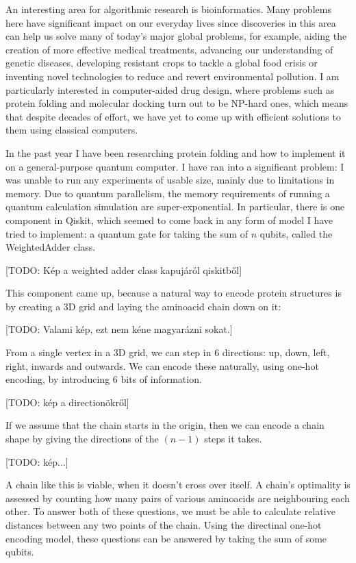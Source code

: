 An interesting area for algorithmic research is bioinformatics. Many problems here have significant impact on our everyday lives since discoveries in this area can help us solve many of today’s major global problems, for example, aiding the creation of more effective medical treatments, advancing our understanding of genetic diseases, developing resistant crops to tackle a global food crisis or inventing novel technologies to reduce and revert environmental pollution. I am particularly interested in computer-aided drug design, where problems such as protein folding and molecular docking turn out to be NP-hard ones, which means that despite decades of effort, we have yet to come up with efficient solutions to them using classical computers.

In the past year I have been researching protein folding and how to implement it on a general-purpose quantum computer. I have ran into a significant problem: I was unable to run any experiments of usable size, mainly due to limitations in memory. Due to quantum parallelism, the memory requirements of running a quantum calculation simulation are super-exponential. In particular, there is one component in Qiskit, which seemed to come back in any form of model I have tried to implement: a quantum gate for taking the sum of $n$ qubits, called the WeightedAdder class. 

[TODO: Kép a weighted adder class kapujáról qiskitből]

This component came up, because a natural way to encode protein structures is by creating a 3D grid and laying the aminoacid chain down on it:

[TODO: Valami kép, ezt nem kéne magyarázni sokat.]

From a single vertex in a 3D grid, we can step in $6$ directions: up, down, left, right, inwards and outwards. We can encode these naturally, using one-hot encoding, by introducing $6$ bits of information.

[TODO: kép a directionökről]

If we assume that the chain starts in the origin, then we can encode a chain shape by giving the directions of the $(n-1)$ steps it takes.

[TODO: kép...]

A chain like this is viable, when it doesn't cross over itself. A chain's optimality is assessed by counting how many pairs of various aminoacids are neighbouring each other. To answer both of these questions, we must be able to calculate relative distances between any two points of the chain. Using the directinal one-hot encoding model, these questions can be answered by taking the sum of some qubits.

